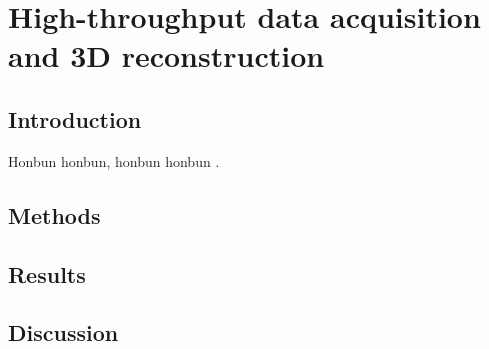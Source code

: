 \chapter{High-throughput data acquisition and 3D reconstruction}

\section{Introduction}

Honbun honbun, honbun honbun \citep{zhao_crop_2019}. 


\section{Methods}


\section{Results}

\section{Discussion}